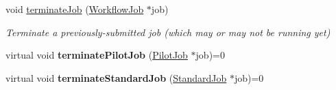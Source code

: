 \begin{DoxyCompactItemize}
void \hyperlink{classwrench_1_1_compute_service_aba97c346fb8f171f17ec09681be37d7f}{terminate\+Job} (\hyperlink{classwrench_1_1_workflow_job}{Workflow\+Job} $\ast$job)
\begin{DoxyCompactList}\small\item\em Terminate a previously-\/submitted job (which may or may not be running yet) \end{DoxyCompactList}\item 
\mbox{\label{classwrench_1_1_compute_service_aba3fad85c3f62b9764fc5a05d4d0edd0}} 
virtual void {\bfseries terminate\+Pilot\+Job} (\hyperlink{classwrench_1_1_pilot_job}{Pilot\+Job} $\ast$job)=0
\item 
\mbox{\label{classwrench_1_1_compute_service_aa648a19b246d650827924d0e829dd2b6}} 
virtual void {\bfseries terminate\+Standard\+Job} (\hyperlink{classwrench_1_1_standard_job}{Standard\+Job} $\ast$job)=0
\end{DoxyCompactItemize}
